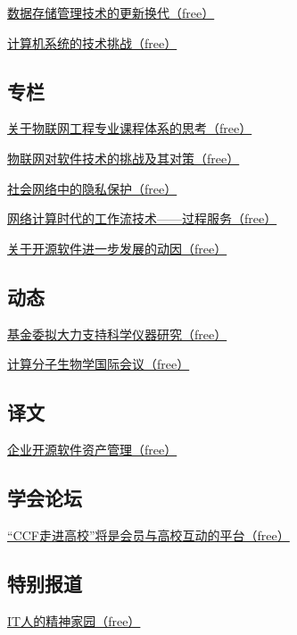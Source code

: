 \documentclass[a4paper]{article}
\begin{document}
\href{http://history.ccf.org.cn/resources/1190201776262/2011/01/18/201101-7.pdf}{数据存储管理技术的更新换代（free）}

\href{http://history.ccf.org.cn/resources/1190201776262/2011/01/18/201101-8.pdf}{计算机系统的技术挑战（free）}

\subsection{专栏}
\href{http://history.ccf.org.cn/resources/1190201776262/2011/01/18/201101-10.pdf}{关于物联网工程专业课程体系的思考（free）}

\href{http://history.ccf.org.cn/resources/1190201776262/2011/01/18/201101-11.pdf}{物联网对软件技术的挑战及其对策（free）}

\href{http://history.ccf.org.cn/resources/1190201776262/2011/01/18/201101-12.pdf}{社会网络中的隐私保护（free）}

\href{http://history.ccf.org.cn/resources/1190201776262/2011/01/18/201101-13.pdf}{网络计算时代的工作流技术——过程服务（free）}

\href{http://history.ccf.org.cn/resources/1190201776262/2011/01/18/201101-14.pdf}{关于开源软件进一步发展的动因（free）}

\subsection{动态}
\href{http://history.ccf.org.cn/resources/1190201776262/2011/01/18/201101-15.pdf}{基金委拟大力支持科学仪器研究（free）}

\href{http://history.ccf.org.cn/resources/1190201776262/2011/01/18/201101-16.pdf}{计算分子生物学国际会议（free）}

\subsection{译文}
\href{http://history.ccf.org.cn/resources/1190201776262/2011/01/18/201101-17.pdf}{企业开源软件资产管理（free）}

\subsection{学会论坛}
\href{http://history.ccf.org.cn/resources/1190201776262/2011/01/18/201101-19.pdf}{“CCF走进高校”将是会员与高校互动的平台（free）}

\subsection{特别报道}
\href{http://history.ccf.org.cn/resources/1190201776262/2011/01/18/201101-18.pdf}{IT人的精神家园（free）}
\end{document}
